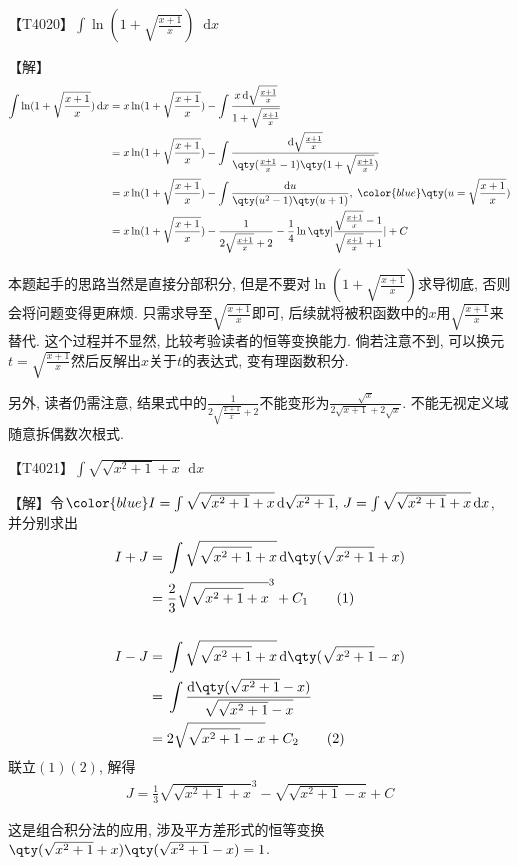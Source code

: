 \documentclass{ctexbook}
\newcommand*{\dif}{\mathop{}\!\mathrm{d}}
\begin{document}
{【T4020】$\int\ln(1+\sqrt{\frac{x+1}{x}})\dif{x}$\par
【解】
\begin{align*}
\int\ln(1+\sqrt{\frac{x+1}{x}})\dif{x}={}&x\ln(1+\sqrt{\frac{x+1}{x}})-\int\frac{x\dif{\sqrt{\frac{x+1}{x}}}}{1+\sqrt{\frac{x+1}{x}}}\\
={}&x\ln(1+\sqrt{\frac{x+1}{x}})-\int\frac{\dif{\sqrt{\frac{x+1}{x}}}}{\qty(\frac{x+1}{x}-1)\qty(1+\sqrt{\frac{x+1}{x}})}\\
={}&x\ln(1+\sqrt{\frac{x+1}{x}})-\int\frac{\dif{u}}{\qty(u^{2}-1)\qty(u+1)},\;{\color{blue}\qty(u=\sqrt{\frac{x+1}{x}})}\\
={}&x\ln(1+\sqrt{\frac{x+1}{x}})-\frac{1}{2\sqrt{\frac{x+1}{x}}+2}-\frac{1}{4}\ln\qty|\frac{\sqrt{\frac{x+1}{x}}-1}{\sqrt{\frac{x+1}{x}}+1}|+C
\end{align*}\par
{\kaishu 本题起手的思路当然是直接分部积分, 但是不要对$\ln(1+\sqrt{\frac{x+1}{x}})$求导彻底, 否则会将问题变得更麻烦. 只需求导至$\sqrt{\frac{x+1}{x}}$即可, 后续就将被积函数中的$x$用$\sqrt{\frac{x+1}{x}}$来替代. 这个过程并不显然, 比较考验读者的恒等变换能力. 倘若注意不到, 可以换元$t=\sqrt{\frac{x+1}{x}}$然后反解出$x$关于$t$的表达式, 变有理函数积分. \par
另外, 读者仍需注意, 结果式中的$\frac{1}{2\sqrt{\frac{x+1}{x}}+2}$不能变形为$\frac{\sqrt{x}}{2\sqrt{x+1}+2\sqrt{x}}$. 不能无视定义域随意拆偶数次根式. \par}
【T4021】$\int\sqrt{\sqrt{x^{2}+1}+x}\dif{x}$\par
【解】令$\color{blue}I=\int\sqrt{\sqrt{x^{2}+1}+x}\dif{\sqrt{x^{2}+1}},\,J=\int\sqrt{\sqrt{x^{2}+1}+x}\dif{x}$, 并分别求出
\begin{align*}
I+J={}&\int\sqrt{\sqrt{x^{2}+1}+x}\dif{\qty(\sqrt{x^{2}+1}+x)}\\
={}&\frac{2}{3}\sqrt{\sqrt{x^{2}+1}+x}^{3}+C_{1}\tag{1}\\
\\
I-J={}&\int\sqrt{\sqrt{x^{2}+1}+x}\dif{\qty(\sqrt{x^{2}+1}-x)}\\
={}&\int\frac{\dif{\qty(\sqrt{x^{2}+1}-x)}}{\sqrt{\sqrt{x^{2}+1}-x}}\\
={}&2\sqrt{\sqrt{x^{2}+1}-x}+C_{2}\tag{2}
\end{align*}
联立$(1)(2)$, 解得
\begin{align*}
J=\frac{1}{3}\sqrt{\sqrt{x^{2}+1}+x}^{3}-\sqrt{\sqrt{x^{2}+1}-x}+C
\end{align*}\par
{\kaishu 这是组合积分法的应用, 涉及平方差形式的恒等变换$\qty(\sqrt{x^{2}+1}+x)\qty(\sqrt{x^{2}+1}-x)=1$. \par}
}
\end{document}
